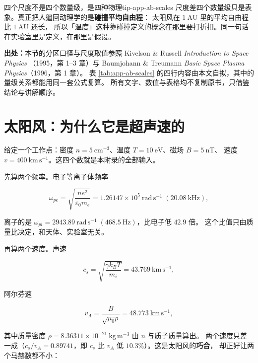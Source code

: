 \begin{tip}{四个尺度不是四个数量级，是四种物理}{tip-app-ab-scales}
尺度差四个数量级只是表象。真正把人逼回动理学的是\textbf{碰撞平均自由程}：
太阳风在 $1\ \mathrm{AU}$ 里的平均自由程比 $1\ \mathrm{AU}$ 还长，
所以「温度」这种靠碰撞定义的概念在那里要打折扣。同一句话在实验室里是定义，在那里是假设。
\end{tip}

{\footnotesize
\textbf{出处：}本节的分区口径与尺度取值参照 Kivelson \& Russell \emph{Introduction to Space Physics}
（1995，第 1--3 章）与 Baumjohann \& Treumann \emph{Basic Space Plasma Physics}（1996，第 1 章）。
表 \ref{tab:app-ab-scales} 的四行内容由本文自拟，其中的量级关系都能用同一套公式复算。
所有文字、数值与表格均不复制原书，只借鉴结论与讲解顺序。
}

\section{太阳风：为什么它是超声速的}
\label{sec:app-ab-solarwind}

给定一个工作点：密度 $n=5\ \mathrm{cm^{-3}}$、温度 $T=10\ \mathrm{eV}$、磁场 $B=5\ \mathrm{nT}$、
速度 $v=400\ \mathrm{km\,s^{-1}}$。这四个数就是本附录的全部输入。

先算两个频率。电子等离子体频率

\begin{equation}
\omega_{pe}=\sqrt{\frac{n e^2}{\varepsilon_0 m_e}}
=1.26147\times10^{5}\ \mathrm{rad\,s^{-1}}\;(20.08\ \mathrm{kHz}),
\label{eq:app-ab-omegape}
\end{equation}

离子的是 $\omega_{pi}=2943.89\ \mathrm{rad\,s^{-1}}\;(468.5\ \mathrm{Hz})$，比电子低 $42.9$ 倍。
这个比值只由质量比决定，和天体、实验室无关。

再算两个速度。声速

\begin{equation}
c_s=\sqrt{\frac{\gamma k_BT}{m_i}}
=43.769\ \mathrm{km\,s^{-1}},
\label{eq:app-ab-cs}
\end{equation}

阿尔芬速

\begin{equation}
v_A=\frac{B}{\sqrt{\mu_0\rho}}
=48.773\ \mathrm{km\,s^{-1}},
\label{eq:app-ab-va}
\end{equation}

其中质量密度 $\rho=8.36311\times10^{-21}\ \mathrm{kg\,m^{-3}}$ 由 $n$ 与质子质量算出。
两个速度只差一成（$c_s/v_A=0.89741$，即 $c_s$ 比 $v_A$ 低 $10.3\%$）。这是太阳风的\textbf{巧合}，
却正好让两个马赫数都不小：

